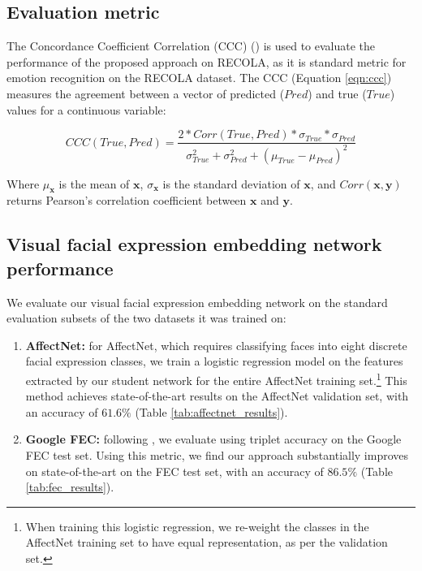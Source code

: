 \documentclass[times,twocolumn,final,authoryear]{elsarticle}
\begin{document}
	\subsection{Evaluation metric}
	\label{sec:ccc}
	The Concordance Coefficient Correlation (CCC) (\cite{lawrence1989}) is used to evaluate the performance of the proposed approach on RECOLA, as it is standard metric for emotion recognition on the RECOLA dataset. The CCC (Equation \ref{eqn:ccc}) measures the agreement between a vector of predicted ($Pred$) and true ($True$) values for a continuous variable:
	
	\begin{equation}
	CCC(True,Pred)=\frac{2 * {Corr(True, Pred) } * {\sigma_{True}} * {\sigma_{Pred}}} {\sigma^2_{True}+\sigma^2_{Pred}+(\mu_{True}-\mu_{Pred})^2}
	\label{eqn:ccc}
	\end{equation}
	
	Where $\mu_{\mathbf{x}}$ is the mean of $\mathbf{x}$, $\sigma_{\mathbf{x}}$ is the standard deviation of $\mathbf{x}$, and $Corr(\mathbf{x}, \mathbf{y})$ returns Pearson's correlation coefficient between $\mathbf{x}$ and $\mathbf{y}$.
	
	\subsection{Visual facial expression embedding network performance}
	\label{sec:visperf}
	
	We evaluate our visual facial expression embedding network on the standard evaluation subsets of the two datasets it was trained on:
	\begin{enumerate}
		\item \textbf{AffectNet:} for AffectNet, which requires classifying faces into eight discrete facial expression classes, we train a logistic regression model on the features extracted by our student network for the entire AffectNet training set.\footnote{When training this logistic regression, we re-weight the classes in the AffectNet training set to have equal representation, as per the validation set.} This method achieves state-of-the-art results on the AffectNet validation set, with an accuracy of $61.6\%$ (Table \ref{tab:affectnet_results}).
		\item \textbf{Google FEC:} following \cite{GoogleFEC}, we evaluate using triplet accuracy on the Google FEC test set. Using this metric, we find our approach substantially improves on state-of-the-art on the FEC test set, with an accuracy of $86.5\%$ (Table \ref{tab:fec_results}).
	\end{enumerate}
	
\end{document}
